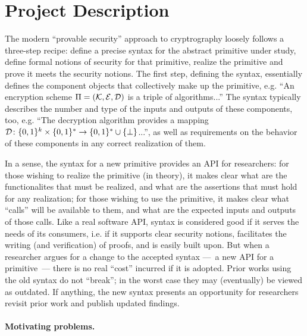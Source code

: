 \section{Project Description}
\label{sec:intro}
The modern ``provable security'' approach to cryptrography loosely follows a three-step recipe: define a precise syntax for the abstract primitive under study, define formal notions of security for that primitive, realize the primitive and prove it meets the security notions.  The first step, defining the syntax, essentially defines the component objects that collectively make up the primitive, e.g. ``An encryption scheme $\Pi=(\mathcal{K},\mathcal{E},\mathcal{D})$ is a triple of algorithms...''  The syntax typically describes the number and type of the inputs and outputs of these components, too, e.g. ``The decryption algorithm provides a mapping $\mathcal{D}\colon\{0,1\}^{k}\times\{0,1\}^* \to \{0,1\}^* \cup \{\bot\}$...'', as well as requirements on the behavior of these components in any correct realization of them.   
%

In a sense, the syntax for a new primitive provides an API for researchers: for those wishing to realize the primitive (in theory), it makes clear what are the functionalites that must be realized, and what are the assertions that must hold for any realization; for those wishing to use the primitive, it makes clear what ``calls'' will be available to them, and what are the expected inputs and outputs of those calls.  
%
Like a real software API, syntax is considered good if it serves the needs of its consumers, i.e. if it supports clear security notions, facilitates the writing (and verification) of proofs, and is easily built upon.  But when a researcher argues for a change to the accepted syntax ---~a new API for a primitive~--- there is no real ``cost'' incurred if it is adopted.  Prior works using the old syntax do not ``break''; in the worst case they may (eventually) be viewed as outdated.  If anything, the new syntax presents an opportunity for researchers revisit prior work and publish updated findings.  





\paragraph{Motivating problems.}  

